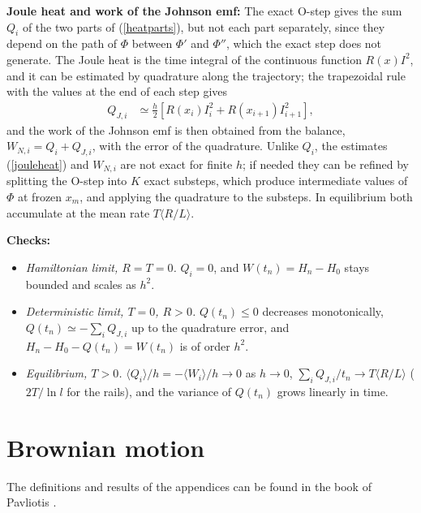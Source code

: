 \documentclass[11pt]{article}
\begin{document}
{\bf Joule heat and work of the Johnson emf:} The exact O-step gives the sum $Q_i$ of the two parts of (\ref{heatparts}), but not each part separately, since they depend on the path of $\Phi$ between $\Phi'$ and $\Phi''$, which the exact step does not generate. The Joule heat is the time integral of the continuous function $R(x)I^2$, and it can be estimated by quadrature along the trajectory; the trapezoidal rule with the values at the end of each step gives
\begin{align}
  Q_{J,i}&\simeq\frac{h}{2}\left[R(x_i)I_i^2+R(x_{i+1})I_{i+1}^2\right],
  \label{jouleheat}
\end{align}
and the work of the Johnson emf is then obtained from the balance, $W_{N,i}=Q_i+Q_{J,i}$, with the error of the quadrature. Unlike $Q_i$, the estimates (\ref{jouleheat}) and $W_{N,i}$ are not exact for finite $h$; if needed they can be refined by splitting the O-step into $K$ exact substeps, which produce intermediate values of $\Phi$ at frozen $x_m$, and applying the quadrature to the substeps. In equilibrium both accumulate at the mean rate $T\langle R/L\rangle$.

{\bf Checks:}
\begin{itemize}
\item {\it Hamiltonian limit, $R=T=0$.} $Q_i=0$, and $W(t_n)=H_n-H_0$ stays bounded and scales as $h^2$.
\item {\it Deterministic limit, $T=0$, $R>0$.} $Q(t_n)\le0$ decreases monotonically, $Q(t_n)\simeq-\sum_iQ_{J,i}$ up to the quadrature error, and $H_n-H_0-Q(t_n)=W(t_n)$ is of order $h^2$.
\item {\it Equilibrium, $T>0$.} $\langle Q_i\rangle/h=-\langle W_i\rangle/h\to0$ as $h\to0$, $\sum_iQ_{J,i}/t_n\to T\langle R/L\rangle$ ($2T/\ln l$ for the rails), and the variance of $Q(t_n)$ grows linearly in time.
\end{itemize}








\appendix

\section{Brownian motion}
The definitions and results of the appendices can be found in the book of Pavliotis \cite{pavliotis}.
\end{document}
